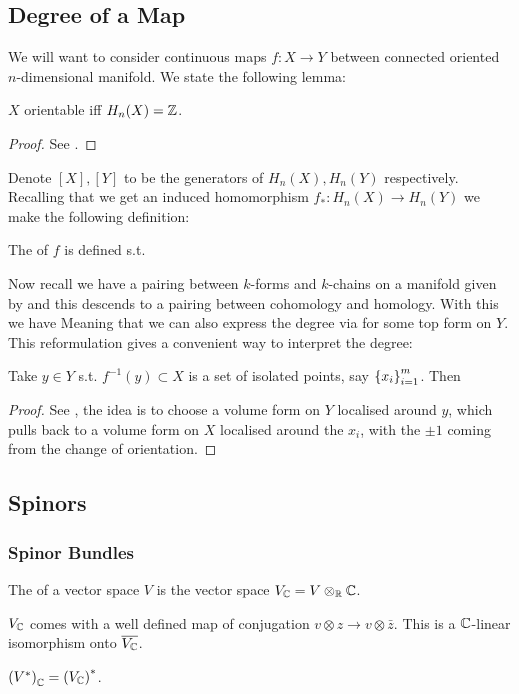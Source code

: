 \documentclass{article}
\begin{document}
\subsection{Degree of a Map}
We will want to consider continuous maps $f:X \to Y$ between connected oriented $n$-dimensional manifold. We state the following lemma:
\begin{lemma}
	$X$ orientable iff $H_n(X) = \mathbb{Z}$. 
\end{lemma}
\begin{proof}
	See \cite{Hatcher2002}.
\end{proof}
Denote $[X], [Y]$ to be the generators of $H_n(X), H_n(Y)$ respectively. Recalling that we get an induced homomorphism $f_\ast : H_n(X) \to H_n(Y)$ we make the following definition:
\begin{definition}
	The  of $f$ is defined s.t. 
\end{definition}
Now recall we have a pairing between $k$-forms and $k$-chains on a manifold given by 
and this descends to a pairing between cohomology and homology. With this we have 
Meaning that we can also express the degree via 
for some top form on $Y$. This reformulation gives a convenient way to interpret the degree:
\begin{prop}
	Take $y \in Y$ s.t. $f^{-1}(y) \subset X$ is a set of isolated points, say $\left\{ x_i \right\}_{i=1}^m$. Then 
\end{prop}
\begin{proof}
	See \cite{Manton2004}, the idea is to choose a volume form on $Y$ localised around $y$, which pulls back to a volume form on $X$ localised around the $x_i$, with the $\pm1$ coming from the change of orientation. 
\end{proof}
\subsection{Spinors}
\subsubsection{Spinor Bundles}
\begin{definition}
	The  of a vector space $V$ is the vector space $V_{\mathbb{C}} = V \otimes_{\mathbb{R}} \mathbb{C}$. 
\end{definition}
\begin{prop}
	$V_{\mathbb{C}}$ comes with a well defined map of conjugation $v \otimes z \to v \otimes \bar{z}$. This is a $\mathbb{C}$-linear isomorphism onto $\overline{V_{\mathbb{C}}}$. 
\end{prop}
\begin{lemma}
	$\left( V^\ast \right)_{\mathbb{C}} = \left( V_{\mathbb{C}} \right)^\ast$. 
\end{lemma}
\end{document}

